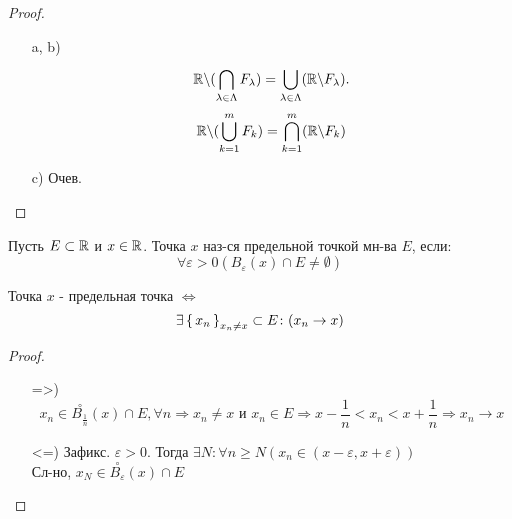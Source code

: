 \begin{proof}
\begin{itemize}
  \item [a, b) ] \[
  \mathbb{R} \backslash (\bigcap_{\lambda \in \Lambda}^{}F_\lambda) = \bigcup_{\lambda \in \Lambda}^{} (\mathbb{R} \backslash F_\lambda).
  \]
  \[
  \mathbb{R} \backslash (\bigcup_{k = 1}^{m} F_k) = \bigcap_{k = 1}^{m} (\mathbb{R} \backslash F_k)
  \]
\item [c)] Очев.
\end{itemize}
\end{proof}
\begin{definition}
Пусть $E \subset \mathbb{R}$ и $x \in \mathbb{R}$. Точка $x$ наз-ся предельной точкой мн-ва $E$, если:
\[
\forall \varepsilon > 0 (B_{\varepsilon}(x) \cap E \neq \emptyset)
\]
\end{definition}
\begin{lemma}
Точка $x$ - предельная точка $\iff$
\[
  \exists \set{x_n}_{x_n \neq x} \subset E \colon (x_n \rightarrow x)
\]
\end{lemma}
\begin{proof}
\begin{itemize}
  \item [=>)]
    \[
      x_n \in \overset{\circ}{B_{\frac{1}{n}}}(x) \cap E, \forall n \Rightarrow x_n \neq x \text{ и } x_n \in E \Rightarrow x - \frac{1}{n} < x_n < x + \frac{1}{n} \Rightarrow x_n \rightarrow x
    \]
  \item [<=)] Зафикс. $\varepsilon > 0$. Тогда $\exists N \colon \forall n \geq N (x_n \in (x -\varepsilon, x + \varepsilon))$ \\
    Сл-но, $x_N \in \overset{\circ}{B_{\varepsilon}}(x) \cap E$
\end{itemize}
\end{proof}

